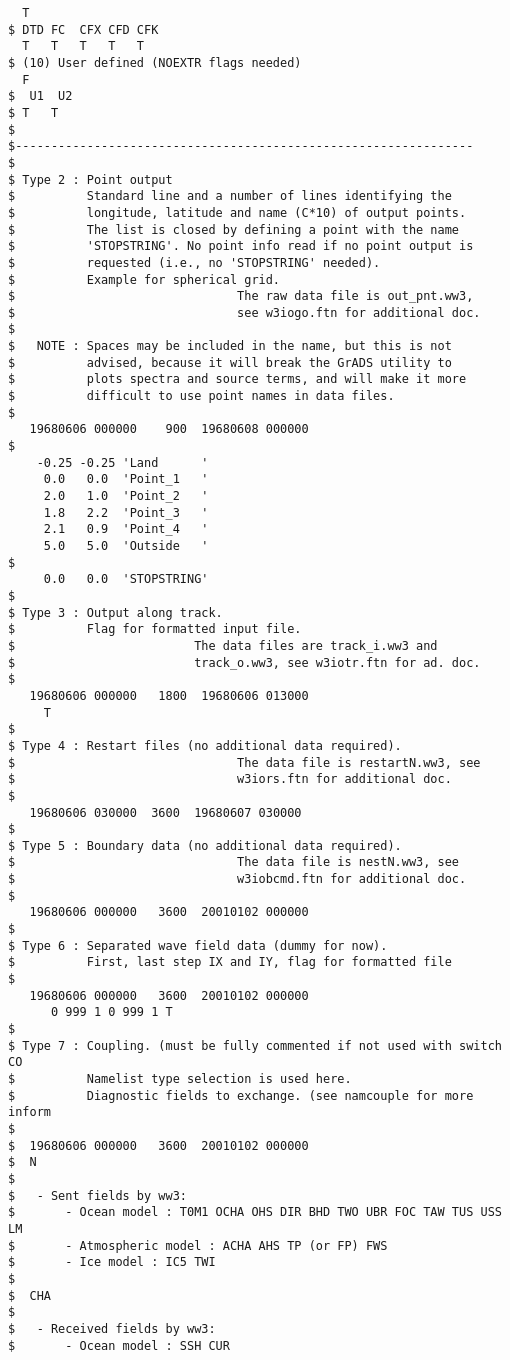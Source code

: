 \begin{footnotesize}
\begin{verbatim}
  T
$ DTD FC  CFX CFD CFK
  T   T   T   T   T
$ (10) User defined (NOEXTR flags needed)
  F
$  U1  U2
$ T   T
$
$----------------------------------------------------------------
$
$ Type 2 : Point output
$          Standard line and a number of lines identifying the 
$          longitude, latitude and name (C*10) of output points.
$          The list is closed by defining a point with the name
$          'STOPSTRING'. No point info read if no point output is
$          requested (i.e., no 'STOPSTRING' needed).
$          Example for spherical grid.
$                               The raw data file is out_pnt.ww3, 
$                               see w3iogo.ftn for additional doc.
$
$   NOTE : Spaces may be included in the name, but this is not
$          advised, because it will break the GrADS utility to 
$          plots spectra and source terms, and will make it more
$          difficult to use point names in data files.
$
   19680606 000000    900  19680608 000000
$
    -0.25 -0.25 'Land      '
     0.0   0.0  'Point_1   '
     2.0   1.0  'Point_2   '
     1.8   2.2  'Point_3   '
     2.1   0.9  'Point_4   '
     5.0   5.0  'Outside   '
$
     0.0   0.0  'STOPSTRING'
$
$ Type 3 : Output along track.
$          Flag for formatted input file.
$                         The data files are track_i.ww3 and
$                         track_o.ww3, see w3iotr.ftn for ad. doc.
$
   19680606 000000   1800  19680606 013000
     T
$
$ Type 4 : Restart files (no additional data required).
$                               The data file is restartN.ww3, see
$                               w3iors.ftn for additional doc.
$
   19680606 030000  3600  19680607 030000
$
$ Type 5 : Boundary data (no additional data required).
$                               The data file is nestN.ww3, see
$                               w3iobcmd.ftn for additional doc.
$
   19680606 000000   3600  20010102 000000
$
$ Type 6 : Separated wave field data (dummy for now).
$          First, last step IX and IY, flag for formatted file
$
   19680606 000000   3600  20010102 000000
      0 999 1 0 999 1 T
$
$ Type 7 : Coupling. (must be fully commented if not used with switch CO
$          Namelist type selection is used here.
$          Diagnostic fields to exchange. (see namcouple for more inform
$
$  19680606 000000   3600  20010102 000000
$  N
$
$   - Sent fields by ww3:
$       - Ocean model : T0M1 OCHA OHS DIR BHD TWO UBR FOC TAW TUS USS LM
$       - Atmospheric model : ACHA AHS TP (or FP) FWS
$       - Ice model : IC5 TWI
$
$  CHA
$
$   - Received fields by ww3:
$       - Ocean model : SSH CUR

\end{verbatim}
\end{footnotesize}
